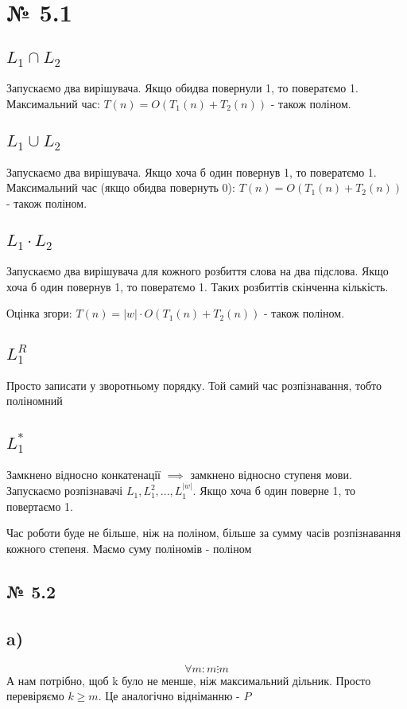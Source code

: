\documentclass[11pt, a4paper]{article} %
\begin{document}
\section*{№ 5.1}
\subsection*{$L_1 \cap L_2$}
Запускаємо два вирішувача. Якщо обидва повернули 1, то повератємо 1. 
Максимальний час: $T(n) = O(T_1(n) + T_2(n))$ - також поліном.


\subsection*{$L_1 \cup L_2$}
Запускаємо два вирішувача. Якщо хоча б один повернув 1, то повератємо 1. 
Максимальний час (якщо обидва повернуть 0): $T(n) = O(T_1(n) + T_2(n))$ - також поліном.


\subsection*{$L_1 \cdot L_2$}
Запускаємо два вирішувача для кожного розбиття слова на два підслова. Якщо хоча б один повернув 1, то повератємо 1. 
Таких розбиттів скінченна кількість.

Оцінка згори: $T(n) = |w| \cdot O(T_1(n) + T_2(n))$ - також поліном.

\subsection*{$L_1^R$}
Просто записати у зворотньому порядку. Той самий час розпізнавання, тобто поліномний

\subsection*{$L_1^*$}
Замкнено відносно конкатенації $\implies$ замкнено відносно ступеня мови. 
Запускаємо розпізнавачі $L_1, L_1^2, ... , L_1^{|w|}$. Якщо хоча б один поверне 1, то повертаємо 1.

Час роботи буде не більше, ніж на поліном, більше за сумму часів розпізнавання кожного степеня. Маємо суму поліномів - поліном

\subsection*{№ 5.2}
\subsection*{a)}
$$\forall m: m \vdots m$$
А нам потрібно, щоб k було не менше, ніж максимальний дільник. Просто перевіряємо $k \ge m$.
Це аналогічно відніманню - $P$
\end{document}
